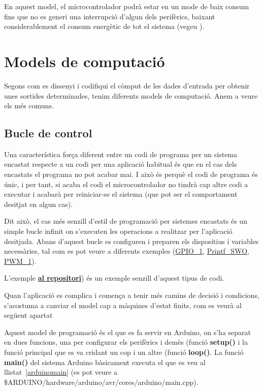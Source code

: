 En aquest model, el microcontrolador podrà estar en un mode de baix consum fins que no es generi una interrupció d'algun dels perifèrics, baixant considerablement el consum energètic de tot el sistema (vegeu ).

\chapter{Models de computació}
\label{ch:modescomputacio}

Segons com es dissenyi i codifiqui el còmput de les dades d'entrada per obtenir unes sortides determinades, tenim diferents models de computació. Anem a veure els més comuns.

\section{Bucle de control}
\label{sec:buclecontrol}

Una característica força diferent entre un codi de programa per un sistema encastat respecte a un codi per una aplicació habitual és que en el cas dels encastats el programa no pot acabar mai. I això és perquè el codi de programa és únic, i per tant, si acaba el codi el microcontrolador no tindrà cap altre codi a executar i acabarà per reiniciar-se el sistema (que pot ser el comportament desitjat en algun cas).

Dit això, el cas més senzill d'estil de programació per sistemes encastats és un simple bucle infinit on s'executen les operacions a realitzar per l'aplicació desitjada. Abans d'aquest bucle es configuren i preparen els dispositius i variables necessàries, tal com es pot veure a diferents exemples (\href{https://github.com/mariusmm/cursembedded/blob/master/Simplicity/GPIO_1/}{GPIO\_1}, \href{https://github.com/mariusmm/cursembedded/tree/master/Simplicity/Printf_SWO}{Printf\_SWO}, \href{https://github.com/mariusmm/cursembedded/blob/master/Simplicity/PWM_1/}{PWM\_1}). 

L'exemple  \href{https://github.com/mariusmm/cursembedded/tree/master/Simplicity/GPIO_1}{\bf al repositori}) és un exemple senzill d'aquest tipus de codi.

Quan l'aplicació es complica i comença a tenir més camins de decisió i condicions, s'acostuma a canviar el model cap a màquines d'estat finits, com es veurà al següent apartat

Aquest model de programació és el que es fa servir en Arduino, on s'ha separat en dues funcions, una per configurar els perifèrics i demès (funció {\bf setup()} i la funció principal que es va cridant un cop i un altre (funció {\bf loop()}. La funció {\bf main()} del sistema Arduino bàsicament executa el que es veu al llistat~\ref{arduinomain} (es pot veure a \$ARDUINO/hardware/arduino/avr/cores/arduino/main.cpp).

